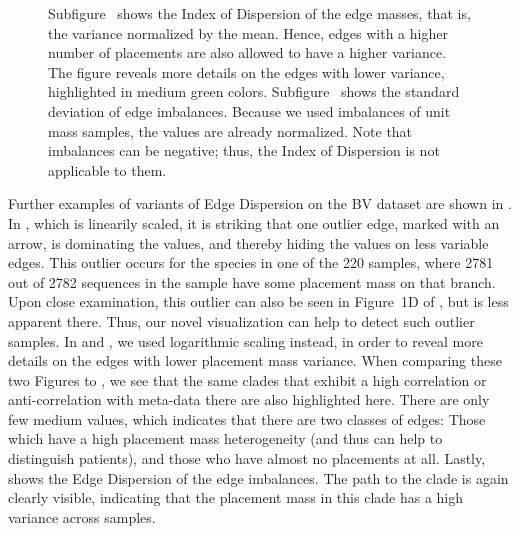 \begin{figure}[!htpb]
{%
        Subfigure~
        shows the Index of Dispersion of the edge masses, that is, the variance normalized by the mean.
        Hence, edges with a higher number of placements are also allowed to have a higher variance.
        The figure reveals more details on the edges with lower variance, highlighted in medium green colors.
        Subfigure~
        shows the standard deviation of edge imbalances.
        Because we used imbalances of unit mass samples, the values are already normalized.
        Note that imbalances can be negative; thus, the Index of Dispersion is not applicable to them.
    }
    \label{fig:all_dispersions}
\end{figure}


Further examples of variants of Edge Dispersion on the \ac{BV} dataset are shown in .
In , which is linearily scaled,
it is striking that one outlier edge, marked with an arrow, is dominating the values,
and thereby hiding the values on less variable edges.
This outlier occurs for the species  in one of the \num{220} samples,
where \num{2 781} out of \num{2 782} sequences in the sample have some placement mass on that branch.
Upon close examination, this outlier can also be seen in Figure~1D of \cite{Srinivasan2012},
but is less apparent there.
Thus, our novel visualization can help to detect such outlier samples.
In  and ,
we used logarithmic scaling instead, in order to reveal more details on the edges with lower placement mass variance.
When comparing these two Figures to ,
we see that the same clades that exhibit a high correlation or anti-correlation with meta-data there
are also highlighted here.
There are only few medium values, which indicates that there are two classes of edges:
Those which have a high placement mass heterogeneity (and thus can help to distinguish patients),
and those who have almost no placements at all.
Lastly,  shows the Edge Dispersion of the edge imbalances.
The path to the  clade is again clearly visible,
indicating that the placement mass in this clade has a high variance across samples.

